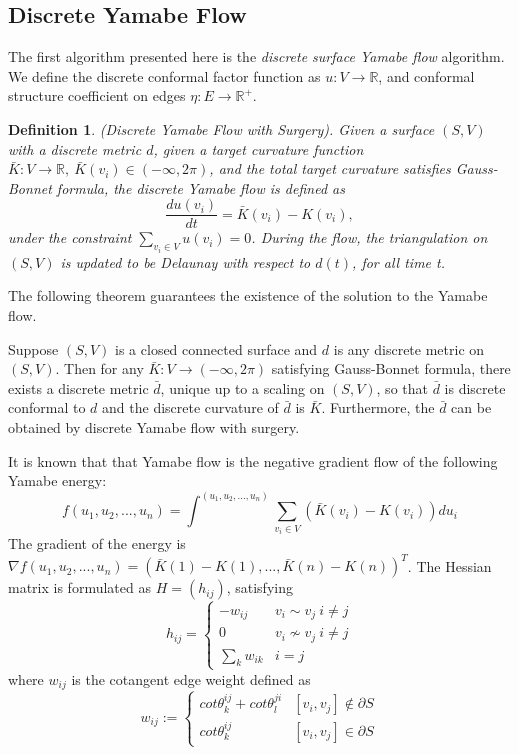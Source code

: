 \documentclass[runningheads]{llncs}
\newtheorem{mydef}{Definition}
\begin{document}
\subsection{Discrete Yamabe Flow}
The first algorithm presented here is the \textit{discrete surface Yamabe flow} algorithm. We define the discrete conformal factor function as $u: V\rightarrow \mathbb{R}$, and conformal structure coefficient on edges $\eta:E\rightarrow \mathbb{R}^+$.
\begin{mydef}
(Discrete Yamabe Flow with Surgery). Given a surface $(S,V)$ with a discrete metric $d$, given a target curvature function $\bar{K}:V\rightarrow \mathbb{R},\ \bar{K}(v_i)\in(-\infty,2\pi)$, and the total target curvature satisfies Gauss-Bonnet formula, the discrete Yamabe flow is defined as $$\dfrac{du(v_i)}{dt}=\bar{K}(v_i)-K(v_i),$$
under the constraint $\sum_{v_i\in V}u(v_i) = 0$. During the flow, the triangulation on $(S,V)$ is updated to be Delaunay with respect to $d(t)$, for all time t.
\end{mydef}

The following theorem guarantees the existence of the solution to the Yamabe flow.

\begin{theorem}
Suppose $(S,V)$ is a closed connected surface and $d$ is any discrete metric on $(S,V)$. Then for any $\bar{K}:V\rightarrow (-\infty,2\pi)$ satisfying Gauss-Bonnet formula, there exists a discrete metric $\bar{d}$, unique up to a scaling on $(S,V)$, so that $\bar{d}$ is discrete conformal to $d$ and the discrete curvature of $\bar{d}$ is $\bar{K}$. Furthermore, the $\bar{d}$ can be obtained by discrete Yamabe flow with surgery.
\end{theorem}

It is known that that Yamabe flow is the negative gradient flow of the following Yamabe energy: $$f(u_1,u_2,...,u_n)=\int^{(u_1,u_2,...,u_n)}\sum_{v_i\in V}(\bar{K}(v_i)-K(v_i))du_i$$
The gradient of the energy is $\nabla f(u_1,u_2,...,u_n)=(\bar{K}(1)-K(1),...,\bar{K}(n)-K(n))^T$. The Hessian matrix is formulated as $H = (h_{ij})$, satisfying
\[
	h_{ij} = \begin{cases}
			-w_{ij} & v_i\sim v_j\  i\neq j \\
			0  &v_i\nsim v_j \ i\neq j \\
			\sum_k w_{ik}  &i=j
		\end{cases}
\]
where $w_{ij}$ is the cotangent edge weight defined as
\[
w_{ij} := \begin{cases}
		cot\theta^{ij}_k+cot\theta^{ji}_l &[v_i,v_j]\notin \partial S \\
		cot\theta^{ij}_k &[v_i,v_j]\in \partial S
	\end{cases}
\]
\end{document}
